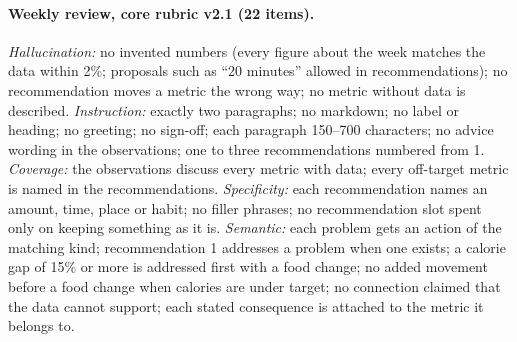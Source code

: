 \documentclass[10pt,twocolumn]{article}
\begin{document}
\paragraph{Weekly review, core rubric v2.1 (22 items).}
\emph{Hallucination:} no invented numbers (every figure about the week matches the data within 2\%; proposals such
as ``20 minutes'' allowed in recommendations); no recommendation moves a metric the wrong way; no metric without data
is described.
\emph{Instruction:} exactly two paragraphs; no markdown; no label or heading; no greeting; no sign-off; each paragraph
150--700 characters; no advice wording in the observations; one to three recommendations numbered from 1.
\emph{Coverage:} the observations discuss every metric with data; every off-target metric is named in the
recommendations.
\emph{Specificity:} each recommendation names an amount, time, place or habit; no filler phrases; no recommendation
slot spent only on keeping something as it is.
\emph{Semantic:} each problem gets an action of the matching kind; recommendation 1 addresses a problem when one
exists; a calorie gap of 15\% or more is addressed first with a food change; no added movement before a food change
when calories are under target; no connection claimed that the data cannot support; each stated consequence is
attached to the metric it belongs to.
\end{document}
